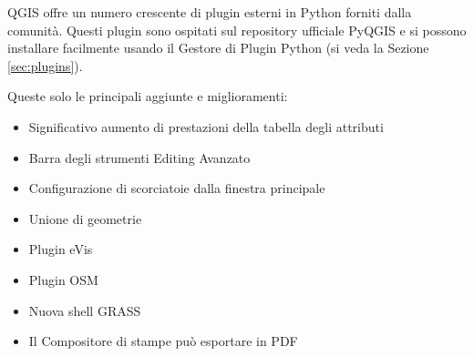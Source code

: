 
QGIS offre un numero crescente di plugin esterni in Python forniti
dalla comunità. Questi plugin sono ospitati sul repository ufficiale
PyQGIS e si possono installare facilmente usando il Gestore di
Plugin Python (si veda la Sezione \ref{sec:plugins}).


Queste solo le principali aggiunte e miglioramenti:
\begin{itemize}
 \item Significativo aumento di prestazioni della tabella degli attributi
 \item Barra degli strumenti Editing Avanzato
 \item Configurazione di scorciatoie dalla finestra principale
 \item Unione di geometrie 
 \item Plugin eVis
 \item Plugin OSM 
 \item Nuova shell GRASS
 \item Il Compositore di stampe può esportare in PDF
\end{itemize}

